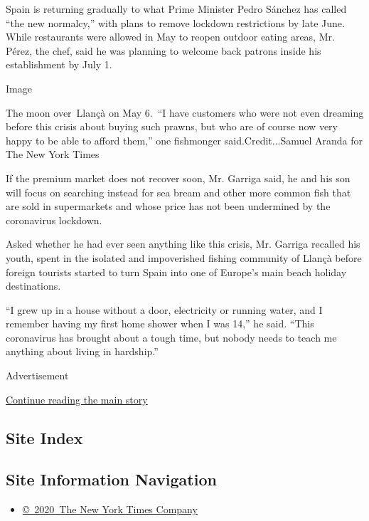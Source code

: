 Spain is returning gradually to what Prime Minister Pedro Sánchez has
called ``the new normalcy,'' with plans to remove lockdown restrictions
by late June. While restaurants were allowed in May to reopen outdoor
eating areas, Mr. Pérez, the chef, said he was planning to welcome back
patrons inside his establishment by July 1.

Image

The moon over~Llançà on May 6.~``I have customers who were not even
dreaming before this crisis about buying such prawns, but who are of
course now very happy to be able to afford them,'' one fishmonger
said.Credit...Samuel Aranda for The New York Times

If the premium market does not recover soon, Mr. Garriga said, he and
his son will focus on searching instead for sea bream and other more
common fish that are sold in supermarkets and whose price has not been
undermined by the coronavirus lockdown.

Asked whether he had ever seen anything like this crisis, Mr. Garriga
recalled his youth, spent in the isolated and impoverished fishing
community of Llançà before foreign tourists started to turn Spain into
one of Europe's main beach holiday destinations.

``I grew up in a house without a door, electricity or running water, and
I remember having my first home shower when I was 14,'' he said. ``This
coronavirus has brought about a tough time, but nobody needs to teach me
anything about living in hardship.''

Advertisement

\protect\hyperlink{after-bottom}{Continue reading the main story}

\hypertarget{site-index}{%
\subsection{Site Index}\label{site-index}}

\hypertarget{site-information-navigation}{%
\subsection{Site Information
Navigation}\label{site-information-navigation}}

\begin{itemize}
\tightlist
\item
  \href{https://help.nytimes3xbfgragh.onion/hc/en-us/articles/115014792127-Copyright-notice}{©~2020~The
  New York Times Company}
\end{itemize}

